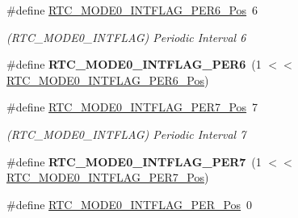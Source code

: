 \begin{DoxyCompactItemize}
\item 
\hypertarget{group___s_a_m_l21___r_t_c_gab9e4b133a6d58356d74d977298e46067}{}\#define \hyperlink{group___s_a_m_l21___r_t_c_gab9e4b133a6d58356d74d977298e46067}{R\+T\+C\+\_\+\+M\+O\+D\+E0\+\_\+\+I\+N\+T\+F\+L\+A\+G\+\_\+\+P\+E\+R6\+\_\+\+Pos}~6\label{group___s_a_m_l21___r_t_c_gab9e4b133a6d58356d74d977298e46067}

\begin{DoxyCompactList}\small\item\em (R\+T\+C\+\_\+\+M\+O\+D\+E0\+\_\+\+I\+N\+T\+F\+L\+A\+G) Periodic Interval 6 \end{DoxyCompactList}\item 
\hypertarget{group___s_a_m_l21___r_t_c_gaf35e0f2a3cd0513014789dcceea1063d}{}\#define {\bfseries R\+T\+C\+\_\+\+M\+O\+D\+E0\+\_\+\+I\+N\+T\+F\+L\+A\+G\+\_\+\+P\+E\+R6}~(1 $<$$<$ \hyperlink{group___s_a_m_l21___r_t_c_gab9e4b133a6d58356d74d977298e46067}{R\+T\+C\+\_\+\+M\+O\+D\+E0\+\_\+\+I\+N\+T\+F\+L\+A\+G\+\_\+\+P\+E\+R6\+\_\+\+Pos})\label{group___s_a_m_l21___r_t_c_gaf35e0f2a3cd0513014789dcceea1063d}

\item 
\hypertarget{group___s_a_m_l21___r_t_c_ga64675a4dd907e12508eae8c4493de0bb}{}\#define \hyperlink{group___s_a_m_l21___r_t_c_ga64675a4dd907e12508eae8c4493de0bb}{R\+T\+C\+\_\+\+M\+O\+D\+E0\+\_\+\+I\+N\+T\+F\+L\+A\+G\+\_\+\+P\+E\+R7\+\_\+\+Pos}~7\label{group___s_a_m_l21___r_t_c_ga64675a4dd907e12508eae8c4493de0bb}

\begin{DoxyCompactList}\small\item\em (R\+T\+C\+\_\+\+M\+O\+D\+E0\+\_\+\+I\+N\+T\+F\+L\+A\+G) Periodic Interval 7 \end{DoxyCompactList}\item 
\hypertarget{group___s_a_m_l21___r_t_c_gaca8e2a555a405c4850b2e872bd29a9a3}{}\#define {\bfseries R\+T\+C\+\_\+\+M\+O\+D\+E0\+\_\+\+I\+N\+T\+F\+L\+A\+G\+\_\+\+P\+E\+R7}~(1 $<$$<$ \hyperlink{group___s_a_m_l21___r_t_c_ga64675a4dd907e12508eae8c4493de0bb}{R\+T\+C\+\_\+\+M\+O\+D\+E0\+\_\+\+I\+N\+T\+F\+L\+A\+G\+\_\+\+P\+E\+R7\+\_\+\+Pos})\label{group___s_a_m_l21___r_t_c_gaca8e2a555a405c4850b2e872bd29a9a3}

\item 
\hypertarget{group___s_a_m_l21___r_t_c_gab3ad2d8327b7398d360361c844daa4d8}{}\#define \hyperlink{group___s_a_m_l21___r_t_c_gab3ad2d8327b7398d360361c844daa4d8}{R\+T\+C\+\_\+\+M\+O\+D\+E0\+\_\+\+I\+N\+T\+F\+L\+A\+G\+\_\+\+P\+E\+R\+\_\+\+Pos}~0\label{group___s_a_m_l21___r_t_c_gab3ad2d8327b7398d360361c844daa4d8}


\end{DoxyCompactItemize}
